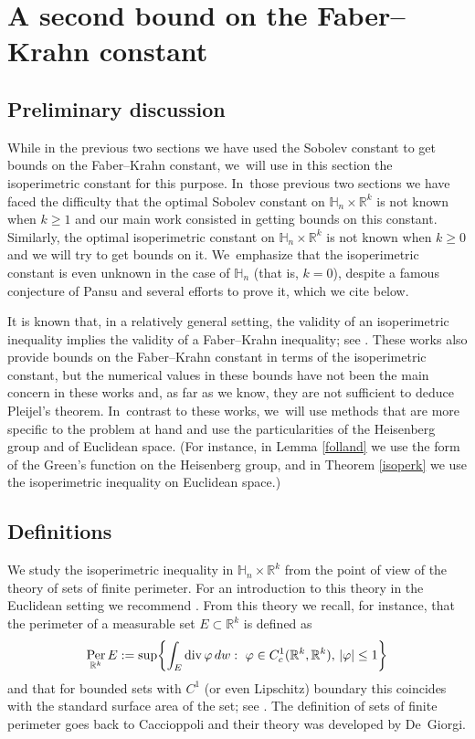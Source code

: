 \documentclass[11pt]{article}
\newcommand{\rc}{\textup{c}}
\theoremstyle{definition}
\let\phi\varphi
\newcommand{\1}{\mathbbm{1}}
\newcommand{\R}{\mathbb{R}}
\DeclareMathOperator{\per}{Per}
\numberwithin{equation}{section}
\begin{document}
\section{A second bound on the Faber--Krahn constant}\label{sec:isoperimetric}

\subsection{Preliminary discussion}
While in the previous two sections we have used the Sobolev constant to get bounds on the Faber--Krahn constant, we~will use in this section the isoperimetric constant for this purpose. In~those previous two sections we have faced the difficulty that the optimal Sobolev constant on $\mathbb H_n\times\R^k$ is not known when $k\geq 1$ and our main work consisted in getting bounds on this constant. Similarly, the optimal isoperimetric constant on $\mathbb H_n\times\R^k$ is not known when $k\geq 0$ and we will try to get bounds on it. We~emphasize that the isoperimetric constant is even unknown in the case of $\mathbb H_n$ (that is, $k=0$), despite a famous conjecture of Pansu \cite{Pa2} and several efforts to prove it, which we cite below.

It is known that, in a relatively general setting, the validity of an isoperimetric inequality implies the validity of a Faber--Krahn inequality; see \cite{Car,BaCoLeSC,Va}. These works also provide bounds on the Faber--Krahn constant in terms of the isoperimetric constant, but the numerical values in these bounds have not been the main concern in these works and, as far as we know, they are not sufficient to deduce Pleijel's theorem. In~contrast to these works, we~will use methods that are more specific to the problem at hand and use the particularities of the Heisenberg group and of Euclidean space. (For instance, in Lemma \ref{folland} we use the form of the Green's function on the Heisenberg group, and in Theorem \ref{isoperk} we use the isoperimetric inequality on Euclidean space.)

\subsection{Definitions}
We study the isoperimetric inequality in $\mathbb H_n\times\R^k$ from the point of view of the theory of sets of finite perimeter. For an introduction to this theory in the Euclidean setting we recommend \cite{Ma}. From this theory we recall, for instance, that the perimeter of a measurable set $E\subset\R^k$ is defined as
\[
\per_{\R^k} E := \sup \biggl\{ \int_E \div \phi \,dw :\ \phi\in C^1_\rc(\R^k,\R^k),\,|\phi|\leq 1\biggr\}
\]
and that for bounded sets with $C^1$ (or even Lipschitz) boundary this coincides with the standard surface area of the set; see \cite[Ex.\,12.5 \& 12.6]{Ma}. The definition of sets of finite perimeter goes back to Caccioppoli and their theory was developed by De~Giorgi.
\end{document}
